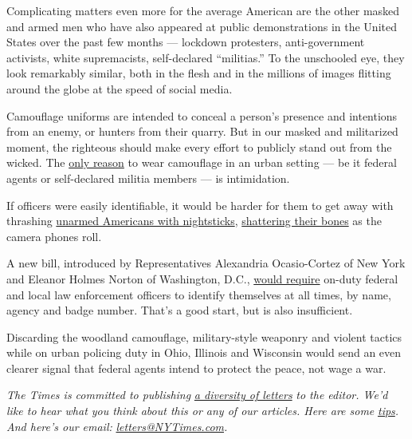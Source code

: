 Complicating matters even more for the average American are the other
masked and armed men who have also appeared at public demonstrations in
the United States over the past few months --- lockdown protesters,
anti-government activists, white supremacists, self-declared
``militias.'' To the unschooled eye, they look remarkably similar, both
in the flesh and in the millions of images flitting around the globe at
the speed of social media.

Camouflage uniforms are intended to conceal a person's presence and
intentions from an enemy, or hunters from their quarry. But in our
masked and militarized moment, the righteous should make every effort to
publicly stand out from the wicked. The
\href{https://taskandpurpose.com/pentagon-run-down/police-military-uniforms-undermines-democracy}{only
reason} to wear camouflage in an urban setting --- be it federal agents
or self-declared militia members --- is intimidation.

If officers were easily identifiable, it would be harder for them to get
away with thrashing
\href{https://taskandpurpose.com/news/navy-veteran-christopher-david-interview-portland}{unarmed
Americans with nightsticks},
\href{https://www.washingtonpost.com/nation/2020/07/20/christopher-david-portland-protest-video/}{shattering
their bones} as the camera phones roll.

A new bill, introduced by Representatives Alexandria Ocasio-Cortez of
New York and Eleanor Holmes Norton of Washington, D.C.,
\href{https://ocasio-cortez.house.gov/sites/ocasio-cortez.house.gov/files/documents/OCASNY_076_xml.pdf}{would
require} on-duty federal and local law enforcement officers to identify
themselves at all times, by name, agency and badge number. That's a good
start, but is also insufficient.

Discarding the woodland camouflage, military-style weaponry and violent
tactics while on urban policing duty in Ohio, Illinois and Wisconsin
would send an even clearer signal that federal agents intend to protect
the peace, not wage a war.

\emph{The Times is committed to publishing}
\href{https://www.nytimes3xbfgragh.onion/2019/01/31/opinion/letters/letters-to-editor-new-york-times-women.html}{\emph{a
diversity of letters}} \emph{to the editor. We'd like to hear what you
think about this or any of our articles. Here are some}
\href{https://help.nytimes3xbfgragh.onion/hc/en-us/articles/115014925288-How-to-submit-a-letter-to-the-editor}{\emph{tips}}\emph{.
And here's our email:}
\href{mailto:letters@NYTimes.com}{\emph{letters@NYTimes.com}}\emph{.}

